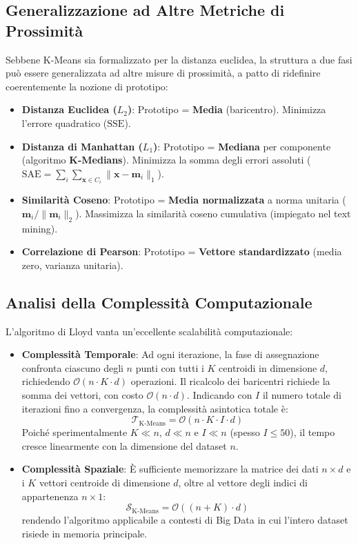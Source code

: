 \FloatBarrier
\subsection{Generalizzazione ad Altre Metriche di Prossimità}

Sebbene K-Means sia formalizzato per la distanza euclidea, la struttura a due fasi può essere generalizzata ad altre misure di prossimità, a patto di ridefinire coerentemente la nozione di prototipo:
\begin{itemize}
    \item \textbf{Distanza Euclidea ($L_2$)}: Prototipo = \textbf{Media} (baricentro). Minimizza l'errore quadratico ($\mathrm{SSE}$).
    \item \textbf{Distanza di Manhattan ($L_1$)}: Prototipo = \textbf{Mediana} per componente (algoritmo \textbf{K-Medians}). Minimizza la somma degli errori assoluti ($\mathrm{SAE} = \sum_{i} \sum_{\mathbf{x} \in C_i} \|\mathbf{x} - \mathbf{m}_i\|_1$).
    \item \textbf{Similarità Coseno}: Prototipo = \textbf{Media normalizzata} a norma unitaria ($\mathbf{m}_i / \|\mathbf{m}_i\|_2$). Massimizza la similarità coseno cumulativa (impiegato nel text mining).
    \item \textbf{Correlazione di Pearson}: Prototipo = \textbf{Vettore standardizzato} (media zero, varianza unitaria).
\end{itemize}

\FloatBarrier
\subsection{Analisi della Complessità Computazionale}

L'algoritmo di Lloyd vanta un'eccellente scalabilità computazionale:
\begin{itemize}
    \item \textbf{Complessità Temporale}: Ad ogni iterazione, la fase di assegnazione confronta ciascuno degli $n$ punti con tutti i $K$ centroidi in dimensione $d$, richiedendo $\mathcal{O}(n \cdot K \cdot d)$ operazioni. Il ricalcolo dei baricentri richiede la somma dei vettori, con costo $\mathcal{O}(n \cdot d)$. Indicando con $I$ il numero totale di iterazioni fino a convergenza, la complessità asintotica totale è:
    \begin{equation}
        \mathcal{T}_{\text{K-Means}} = \mathcal{O}(n \cdot K \cdot I \cdot d)
    \end{equation}
    Poiché sperimentalmente $K \ll n$, $d \ll n$ e $I \ll n$ (spesso $I \le 50$), il tempo cresce linearmente con la dimensione del dataset $n$.
    \item \textbf{Complessità Spaziale}: È sufficiente memorizzare la matrice dei dati $n \times d$ e i $K$ vettori centroide di dimensione $d$, oltre al vettore degli indici di appartenenza $n \times 1$:
    \begin{equation}
        \mathcal{S}_{\text{K-Means}} = \mathcal{O}((n + K) \cdot d)
    \end{equation}
    rendendo l'algoritmo applicabile a contesti di Big Data in cui l'intero dataset risiede in memoria principale.
\end{itemize}


